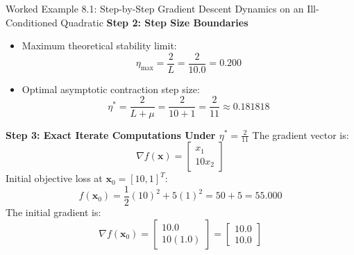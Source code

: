 \begin{examplebox}[breakable]{Worked Example 8.1: Step-by-Step Gradient Descent Dynamics on an Ill-Conditioned Quadratic}
\textbf{Step 2: Step Size Boundaries}
\begin{itemize}
    \item Maximum theoretical stability limit:
    \begin{equation}
    \eta_{\max} = \frac{2}{L} = \frac{2}{10.0} = 0.200
    \end{equation}
    \item Optimal asymptotic contraction step size:
    \begin{equation}
    \eta^* = \frac{2}{L + \mu} = \frac{2}{10 + 1} = \frac{2}{11} \approx 0.181818
    \end{equation}
\end{itemize}

\textbf{Step 3: Exact Iterate Computations Under $\eta^* = \frac{2}{11}$}
The gradient vector is:
\begin{equation}
\nabla f(\mathbf{x}) = \begin{bmatrix} x_1 \\ 10 x_2 \end{bmatrix}
\end{equation}
Initial objective loss at $\mathbf{x}_0 = [10, 1]^T$:
\begin{equation}
f(\mathbf{x}_0) = \frac{1}{2}(10)^2 + 5(1)^2 = 50 + 5 = 55.000
\end{equation}
The initial gradient is:
\begin{equation}
\nabla f(\mathbf{x}_0) = \begin{bmatrix} 10.0 \\ 10(1.0) \end{bmatrix} = \begin{bmatrix} 10.0 \\ 10.0 \end{bmatrix}
\end{equation}


\end{examplebox}
